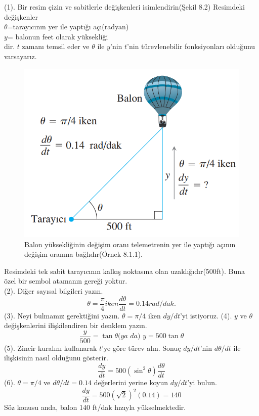 \begin{cozum}
(1). Bir resim çizin ve sabitlerle değişkenleri isimlendirin(Şekil 8.2) Resimdeki değişkenler\\
	$\theta$=tarayıcının yer ile yaptığı açı(radyan)\\
	$y$= balonun feet olarak yüksekliği\\
dir. $t$ zamanı temsil eder ve $\theta$ ile $y$'nin $t$'nin türevlenebilir fonksiyonları olduğunu varsayarız.
\begin{figure}[H]
	\centering
	\includegraphics[width=0.5\linewidth]{iliskilioranlar2.png}
	\caption{Balon yüksekliğinin değişim oranı telemetrenin yer ile yaptığı açının değişim oranına bağlıdır(Örnek 8.1.1).}
\end{figure}
Resimdeki tek sabit tarayıcının kalkış noktasına olan uzaklığıdır(500ft). Buna özel bir sembol atamanın gereği yoktur.\\
(2). Diğer sayısal bilgileri yazın.
	\begin{equation*}
	\theta=\frac{\pi}{4} \textit{iken} \frac{d\theta}{dt}=0.14 \textit{rad/dak.}
	\end{equation*}
(3). Neyi bulmamız gerektiğini yazın. $\theta=\pi /4$ iken $dy/dt$'yi istiyoruz.
(4). $y$ ve $\theta$ değişkenlerini ilişkilendiren bir denklem yazın.
	\begin{equation*}
	\frac{y}{500}=\tan{\theta} \textit{(ya da) } y=500 \tan{\theta}
	\end{equation*}
(5). Zincir kuralını kullanarak $t$'ye göre türev alın. Sonuç $dy/dt$'nin $d\theta/dt$ ile ilişkisinin nasıl olduğunu gösterir.
	\begin{equation*}
	\frac{dy}{dt}=500(\sin^2\theta)\frac{d\theta}{dt}
	\end{equation*}
(6). $\theta=\pi /4$ ve $d\theta/dt=0.14$ değerlerini yerine koyun $dy/dt$'yi bulun.
	\begin{equation*}
	\frac{dy}{dt}=500(\sqrt{2})^2(0.14)=140
	\end{equation*}
Söz konusu anda, balon 140 ft/dak hızıyla yükselmektedir.
\end{cozum}

